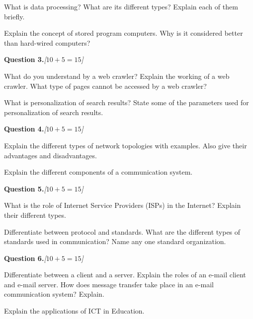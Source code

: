 \documentclass[11pt,a4paper]{article}
\newcommand{\pts}[1]{\hfill   \textit{[#1]}}
\begin{document}
\begin{parts}
  \item What is data processing? What are its different types? Explain each of them briefly.
  \item Explain the concept of stored program computers. Why is it considered better than hard-wired computers?
\end{parts}

\bigskip




\noindent   \textbf{Question 3.}\pts{$10+5=15$}

\begin{parts}
  \item What do you understand by a web crawler? Explain the working of a web crawler. What type of pages cannot be accessed by a web crawler?
  \item What is personalization of search results? State some of the parameters used for personalization of search results.
\end{parts}

\bigskip




\noindent   \textbf{Question 4.}\pts{$10+5=15$}

\begin{parts}
  \item Explain the different types of network topologies with examples. Also give their advantages and disadvantages.
  \item Explain the different components of a communication system.
\end{parts}

\bigskip




\noindent   \textbf{Question 5.}\pts{$10+5=15$}

\begin{parts}
  \item What is the role of Internet Service Providers (ISPs) in the Internet? Explain their different types.
  \item Differentiate between protocol and standards. What are the different types of standards used in communication? Name any one standard organization.
\end{parts}

\bigskip




\noindent   \textbf{Question 6.}\pts{$10+5=15$}

\begin{parts}
  \item Differentiate between a client and a server. Explain the roles of an e-mail client and e-mail server. How does message transfer take place in an e-mail communication system? Explain.
  \item Explain the applications of ICT in Education.
\end{parts}
\end{document}
